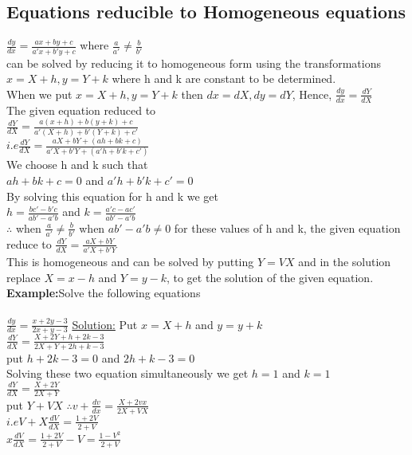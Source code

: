 \documentclass{article}
\begin{document}
\subsection{Equations reducible to Homogeneous equations}
$\frac{dy}{dx}=\frac{\displaystyle ax+by+c}{\displaystyle a'x+b'y+c}$ where $\frac{\displaystyle a}{\displaystyle a'}\neq \frac{\displaystyle b}{\displaystyle b'}$\\
can be solved by reducing it to homogeneous form using the transformations $x=X+h, y=Y+k$ where h and k are constant to be determined.\\
When we put $x=X+h, y=Y+k$ then $dx=dX, dy=dY$, Hence, $\frac{dy}{dx}=\frac{dY}{dX}$\\
The given equation reduced to \\
$\frac{dY}{dX}=\frac{\displaystyle a(x+h)+b(y+k)+c}{\displaystyle a'(X+h)+b'(Y+k)+c'}$\\
$i.e \frac{dY}{dX}=\frac{\displaystyle aX+bY+(ah+bk+c)}{\displaystyle a'X+b'Y+(a'h+b'k+c')}$\\
We choose h and k such that\\
$ah+bk+c=0$ and $a'h+b'k+c'=0$\\
By solving this equation for h and k we get\\
$h=\frac{\displaystyle bc'-b'c}{\displaystyle ab'-a'b}$ and $k=\frac{\displaystyle a'c-ac'}{\displaystyle ab'-a'b}$\\
$\therefore$ when $\frac{\displaystyle a}{\displaystyle a'}\neq\frac{\displaystyle b}{\displaystyle b'}$ when $ab'-a'b\neq 0$ for these values of h and k, the given equation reduce to $\frac{dY}{dX}=\frac{\displaystyle aX+bY}{\displaystyle a'X+b'Y}$\\
This is homogeneous and can be solved by putting $Y=VX$ and in the solution replace $X=x-h$ and $Y=y-k$, to get the solution of the given equation.\\
\textbf{Example:}Solve the following equations\\ \\
$\frac{dy}{dx}=\frac{\displaystyle x+2y-3}{\displaystyle 2x+y-3}$
\underline{Solution:}
Put $x=X+h$ and $y=y+k$\\
$\frac{dY}{dX}=\frac{\displaystyle X+2Y+h+2k-3}{\displaystyle 2X+Y+2h+k-3}$\\
put $h+2k-3=0$ and $2h+k-3=0$\\
Solving these two equation simultaneously we get $h=1$ and $k=1$\\
$\frac{dY}{dX}=\frac{\displaystyle X+2Y}{2X+Y}$\\
put $Y+VX$ $\therefore v+\frac{dv}{dx}=\frac{X+2vx}{2X+VX}$\\
$i.e V+X\frac{dV}{dX}=\frac{\displaystyle 1+2V}{2+V}$\\
$x\frac{dV}{dX}=\frac{\displaystyle 1+2V}{\displaystyle 2+V}-V=\frac{\displaystyle 1-V^2}{\displaystyle 2+V}$
\end{document}
